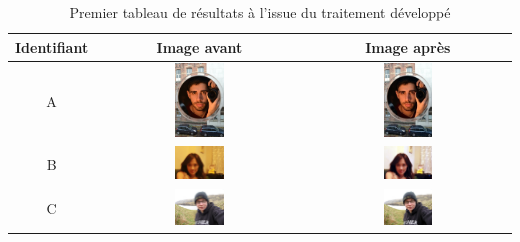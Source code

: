 \documentclass[11pt, french]{report-rd-info}
\begin{document}
\begin{table}
\centering
\begin{tabular}{|c|c|c|}	
   \hline \textbf{Identifiant}  &  \textbf{Image avant}  &  \textbf{Image après}  \\ \hline 
   A & \includegraphics[width=0.25\textwidth]{Resultats/pa_avant} & \includegraphics[width=0.25\textwidth]{Resultats/pa_apres} \\ \hline
   B & \includegraphics[width=0.25\textwidth]{Resultats/pb_avant} & \includegraphics[width=0.25\textwidth]{Resultats/pb_apres} \\ \hline
   C & \includegraphics[width=0.25\textwidth]{Resultats/pc_avant} & \includegraphics[width=0.25\textwidth]{Resultats/pc_apres} \\ \hline   
\end{tabular}
\caption{Premier tableau de résultats à l'issue du traitement développé}
\label{tab:Resultats1}
\end{table}
\end{document}
